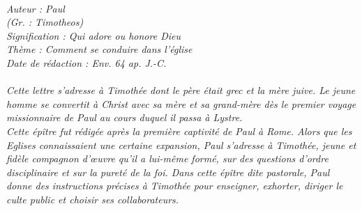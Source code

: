 \BFont
\noindent\hrulefill
{\footnotesize
\textit{
\bigskip
{\centering{}
\\Auteur : Paul
\\(Gr. : Timotheos)
\\Signification : Qui adore ou honore Dieu
\\Thème : Comment se conduire dans l'église
\\Date de rédaction : Env. 64 ap. J.-C.\\}
}
\textit{
\\Cette lettre s'adresse à Timothée dont le père était grec et la mère juive. Le jeune homme se convertit à Christ avec sa mère et sa grand-mère dès le premier voyage missionnaire de Paul au cours duquel il passa à Lystre.
\\Cette épître fut rédigée après la première captivité de Paul à Rome. Alors que les Eglises connaissaient une certaine expansion, Paul s'adresse à Timothée, jeune et fidèle compagnon d'œuvre qu'il a lui-même formé, sur des questions d'ordre disciplinaire et sur la pureté de la foi. Dans cette épître dite pastorale, Paul donne des instructions précises à Timothée pour enseigner, exhorter, diriger le culte public et choisir ses collaborateurs.\bigskip
}
}
\par\nobreak\noindent\hrulefill
